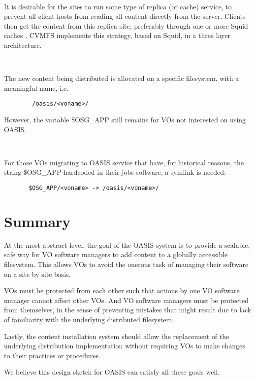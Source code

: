 \documentclass[a4paper]{jpconf}
\begin{document}
~

It is desirable for the sites to run some type of replica (or
cache) service, to prevent all client hosts from reading all content directly
from the server. Clients then get the content from this replica site, preferably through one or more Squid caches \cite{squid}.
CVMFS implements this strategy, based on Squid, in a three layer architecture.

~

The new content being distributed is allocated on a specific filesystem, with a meaningful name, i.e.

\begin{verbatim}
        /oasis/<voname>/ 
\end{verbatim}

However, the  variable \$OSG\_APP still remains for VOs not interested on using OASIS.

~

For those VOs migrating to OASIS service that have, 
for historical reasons, 
the string \$OSG\_APP hardcoded in their jobs software, 
a symlink is needed:

\begin{verbatim}
       $OSG_APP/<voname> -> /oasis/<voname>/ 
\end{verbatim}


\section{Summary}

At the most abstract level, the goal of the OASIS system is to provide a
scalable, safe way for VO software managers to add content to a globally
accessible filesystem. This allows VOs to avoid the onerous task of managing
their software on a site by site basis. 

VOs must be protected from each other such that actions
by one VO software manager cannot affect other VOs. And VO software managers
must be protected from themselves, in the sense of preventing mistakes that
might result due to lack of familiarity with the underlying distributed
filesystem. 

Lastly, the content installation system should allow the replacement of the
underlying distribution implementation without requiring VOs to make changes to
their practices or procedures. 

We believe this design sketch for OASIS can satisfy all these goals well. 

\end{document}
